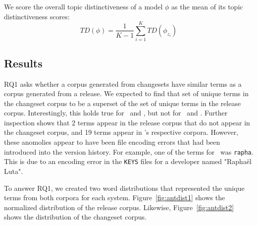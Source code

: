 We score the overall topic distinctiveness of a model $\phi$ as the mean of
its topic distinctiveness scores:
\begin{equation}
TD(\phi) =
\frac{1}{K - 1}
\sum_{i=1}^{K}
TD(\phi_{z_i})
\label{eq:overalltopicdistinctiveness}
\end{equation}



\subsection{Results}

RQ1 asks whether a corpus generated from changesets have similar terms
as a corpus generated from a release.
We expected to find that set of unique terms in the changeset corpus to be
a superset of the set of unique terms in the release corpus.
Interestingly, this holds true for \jodatime\ and \aspectj,
but not for \ant\ and \postgres.
Further inspection shows that 2 terms appear in the \ant release corpus that do not appear in the changeset corpus,
and 19 terms appear in \postgres's respective corpora.
However, these anomolies appear to have been file encoding errors that
had been introduced into the version history.
For example, one of the terms for \ant\ was \texttt{rapha}. This is due
to an encoding error in the \texttt{KEYS} files for a developer named
"Rapha\"{e}l Luta".

To answer RQ1, we created two word distributions that represented the unique
terms from both corpora for each system.
Figure~\ref{fig:antdist1} shows the normalized distribution of the \ant release corpus.
Likewise, Figure~\ref{fig:antdist2} shows the distribution of the \ant changeset corpus.
%
%

